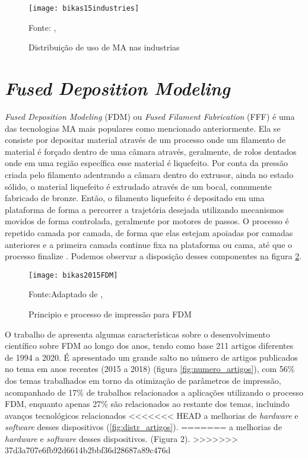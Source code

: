 \begin{figure}[!htb]
    \begin{center}
    \caption{Distribuição de uso de MA nas industrias}
    \texttt{[image: bikas15industries]}

    {\footnotesize Fonte: \citeauthor{bikas16}, \citeyear{bikas16}}
    \label{fig:MA_industrias}
    \end{center}
\end{figure}

\section{\textit{Fused Deposition Modeling}}
\textit{Fused Deposition Modeling} (FDM) ou \textit{Fused Filament Fabrication} 
(FFF) é uma das tecnologias MA mais populares como mencionado anteriormente.
Ela se consiste por depositar material através de um processo 
onde um filamento de material é forçado dentro de uma câmara através,
geralmente, de rolos dentados onde em uma região específica esse 
material é liquefeito. Por conta da pressão criada pelo filamento 
adentrando a câmara dentro do extrusor, ainda no estado sólido, 
o material liquefeito é extrudado através de um bocal, 
comumente fabricado de bronze. Então, o filamento liquefeito é 
depositado em uma plataforma de forma a percorrer a trajetória 
desejada utilizando mecanismos movidos de forma controlada, 
geralmente por motores de passos. O processo é repetido camada 
por camada, de forma que elas estejam apoiadas por camadas 
anteriores e a primeira camada continue fixa na plataforma ou 
cama, até que o processo finalize \cite{turner14}.
Podemos observar a disposição desses componentes na figura \ref{fig:fdm_ex}.

\begin{figure}[!htb]
    \begin{center}
    \caption{Principio e processo de impressão para FDM}
    \texttt{[image: bikas2015FDM]}

    {\footnotesize Fonte:Adaptado de \citeauthor{bikas16}, \citeyear{bikas16}}
    \label{fig:fdm_ex}
    \end{center}
\end{figure}

O trabalho de \cite{vyavahare20} apresenta algumas 
características sobre o desenvolvimento científico sobre 
FDM ao longo dos anos, tendo como base 211 artigos diferentes 
de 1994 a 2020. É apresentado um grande salto no número de 
artigos publicados no tema em anos recentes (2015 a 2018) 
(figura \ref{fig:numero_artigos}), com 56\% dos temas trabalhados em torno da 
otimização de parâmetros de impressão, acompanhado de 17\% de 
trabalhos relacionados a aplicações utilizando o processo FDM, enquanto apenas 27\%
são relacionados ao restante dos temas, incluindo avanços tecnológicos relacionados
<<<<<<< HEAD
a melhorias de \textit{hardware} e \textit{software} desses dispositivos (\ref{fig:distr_artigos}).
=======
a melhorias de \textit{hardware} e \textit{software} desses dispositivos.
(Figura 2).
>>>>>>> 37d3a707e6fb92d6614b2bbf36d28687a89c476d

